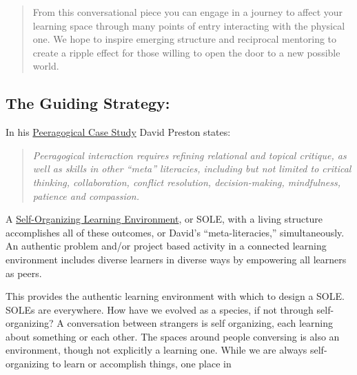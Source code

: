 \begin{quote}
From this conversational piece you can engage in a journey to affect
your learning space through many points of entry interacting with the
physical one. We hope to inspire emerging structure and reciprocal
mentoring to create a ripple effect for those willing to open the door
to a new possible world.
\end{quote}

\subsection{The Guiding Strategy:}\label{the-guiding-strategy}

In his \href{http://peeragogy.org/case-study-5ph1nx/}{Peeragogical Case
Study} David Preston states:

\begin{quote}
\emph{Peeragogical interaction requires refining relational and topical
critique, as well as skills in other ``meta'' literacies, including but
not limited to critical thinking, collaboration, conflict resolution,
decision-making, mindfulness, patience and compassion.}
\end{quote}

A
\href{http://en.wikipedia.org/wiki/Self_Organised_Learning_Environment}{Self-Organizing
Learning Environment}, or SOLE, with a living structure accomplishes all
of these outcomes, or David's ``meta-literacies,'' simultaneously. An
authentic problem and/or project based activity in a connected learning
environment includes diverse learners in diverse ways by empowering all
learners as peers.

This provides the authentic learning environment with which to design
a SOLE. SOLEs are everywhere. How have we evolved as a species, if not
through self-organizing? A conversation between strangers is self
organizing, each learning about something or each other. The spaces
around people conversing is also an environment, though not explicitly
a learning one. While we are always self-organizing to learn or
accomplish things, one place in

